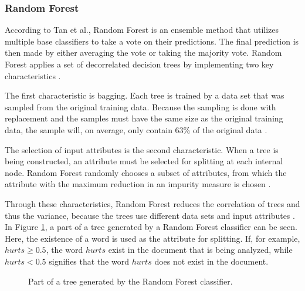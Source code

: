 \subsubsection{Random Forest}
        According to Tan et al., Random Forest is an ensemble method that utilizes multiple base classifiers to take a vote on their predictions. The final prediction is then made by either averaging the vote or taking the majority vote. Random Forest applies a set of decorrelated decision trees by implementing two key characteristics \cite{DBLP:books/aw/TanSKK2019}.
        
        The first characteristic is bagging. Each tree is trained by a data set that was sampled from the original training data. Because the sampling is done with replacement and the samples must have the same size as the original training data, the sample will, on average, only contain 63\% of the original data \cite{DBLP:books/aw/TanSKK2019}.
        
        The selection of input attributes is the second characteristic. When a tree is being constructed, an attribute must be selected for splitting at each internal node. Random Forest randomly chooses a subset of attributes, from which the attribute with the maximum reduction in an impurity measure is chosen \cite{DBLP:books/aw/TanSKK2019}.
        
        Through these characteristics, Random Forest reduces the correlation of trees and thus the variance, because the trees use different data sets and input attributes \cite{DBLP:books/aw/TanSKK2019}. In Figure \ref{fig:tree}, a part of a tree generated by a Random Forest classifier can be seen. Here, the existence of a word is used as the attribute for splitting. If, for example, $hurts \geq 0.5$, the word $hurts$ exist in the document that is being analyzed, while $hurts < 0.5$ signifies that the word $hurts$ does not exist in the document.
        
        \begin{figure}
        \centering
    \caption{Part of a tree generated by the Random Forest classifier.}
      \label{fig:tree}
\end{figure}
